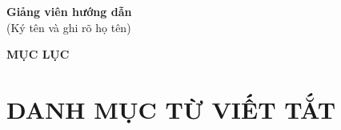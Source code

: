 \documentclass[a4paper,12pt]{report}
\begin{document}
\vspace{0.5cm}
\noindent\makebox[\textwidth]{\dotfill}

\vspace{0.5cm}
\noindent\makebox[\textwidth]{\dotfill}

\vspace{0.5cm}
\noindent\makebox[\textwidth]{\dotfill}

\vspace{0.5cm}
\noindent\makebox[\textwidth]{\dotfill}

\vspace{0.5cm}
\noindent\makebox[\textwidth]{\dotfill}

\vspace{0.5cm}
\noindent\makebox[\textwidth]{\dotfill}

\vspace{0.5cm}
\noindent\makebox[\textwidth]{\dotfill}

\vspace{0.5cm}
\noindent\makebox[\textwidth]{\dotfill}

\vspace{0.5cm}
\noindent\makebox[\textwidth]{\dotfill}

\vspace{0.5cm}
\noindent\makebox[\textwidth]{\dotfill}

\vspace{0.5cm}
\noindent\makebox[\textwidth]{\dotfill}

\vspace{2cm}
\begin{flushright}
    \textbf{Giảng viên hướng dẫn}\\[0.2cm]
    (Ký tên và ghi rõ họ tên)
\end{flushright}


\newpage
\begin{center}
    \Large\textbf{MỤC LỤC}
\end{center}
\vspace{-115pt}

\renewcommand{\contentsname}{} %
\tableofcontents
\newpage


\clearpage
\chapter*{\centering DANH MỤC TỪ VIẾT TẮT}
\end{document}
